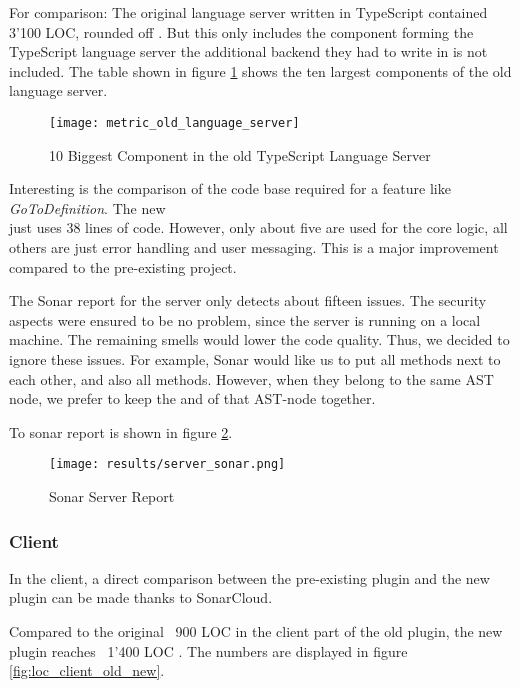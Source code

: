 For comparison: The original language server written in TypeScript contained 3'100 LOC, rounded off \cite{sonar-old_ts_server}.
But this only includes the component forming the TypeScript language server \textendash{} the additional backend they had to write in \Csharp is not included.
The table shown in figure \ref{fig:old_ts_languageserver} shows the ten largest components of the old language server. \\

\begin{figure}[H]
    \centering
    \texttt{[image: metric\_old\_language\_server]}
    \caption{10 Biggest Component in the old TypeScript Language Server}
    \label{fig:old_ts_languageserver}
\end{figure}

Interesting is the comparison of the code base required for a feature like \textit{GoToDefinition}.
The new \\
 just uses 38 lines of code.
However, only about five are used for the core logic, all others are just error handling and user messaging.
This is a major improvement compared to the pre-existing project.

The Sonar report for the server only detects about fifteen issues.
The security aspects were ensured to be no problem, since the server is running on a local machine.
The remaining smells would lower the code quality.
Thus, we decided to ignore these issues.
For example, Sonar would like us to put all  methods next to each other, and also all  methods.
However, when they belong to the same AST node, we prefer to keep the  and  of that AST-node together.

To sonar report is shown in figure \ref{fig:sonarserver}.

\begin{figure}[H]
    \centering
    \texttt{[image: results/server\_sonar.png]}
    \caption{Sonar Server Report}
    \label{fig:sonarserver}
\end{figure}


\subsubsection{Client}
In the client, a direct comparison between the pre-existing plugin and the new plugin can be made thanks to SonarCloud.

Compared to the original ~900 LOC \cite{sonar-client_old} in the client part of the old plugin,
the new plugin reaches ~1'400 LOC \cite{sonar-client_new}.
The numbers are displayed in figure \ref{fig:loc_client_old_new}.

